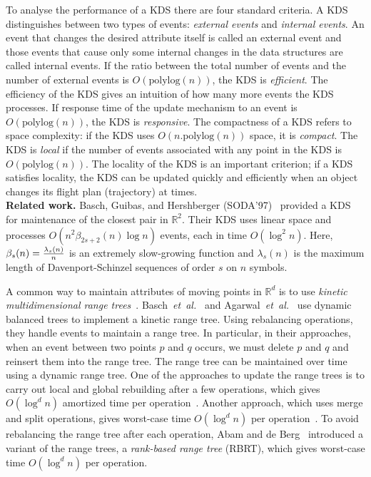 \documentclass[11pt]{llncs}
\newcommand{\etal}{\emph{et~al.}}
\begin{document}
To analyse the performance of a KDS there are four standard criteria. A KDS distinguishes between two types of events: \textit{external events} and \textit{internal events}. An event that changes the desired attribute itself is called an external event and those events that cause only some internal changes in the data structures are called internal events. If the ratio between the total number of events and the number of external events is $O(\text{polylog}(n))$, the KDS is \textit{efficient}. The efficiency of the KDS gives an intuition of how many more events the KDS processes. If response time of the update mechanism to an event is $O(\text{polylog}(n))$, the KDS is \textit{responsive}. The compactness of a KDS refers to space complexity: if the KDS uses $O(n.\text{polylog}(n))$ space, it is \textit{compact}. The KDS is \textit{local} if the number of events associated with any point in the KDS is $O(\text{polylog}(n))$. The locality of the KDS is an important criterion; if a KDS satisfies locality, the KDS can be updated quickly and efficiently when an object changes its flight plan (trajectory) at times. 
\vspace{+5pt}
\\
\textbf{Related work.}
Basch, Guibas, and Hershberger (SODA'97)~\cite{Basch:1997:DSM:314161.314435} provided a KDS for maintenance of the closest pair in $\mathbb{R}^2$. Their KDS uses linear space and processes $O(n^2\beta_{2s+2}(n)\log n)$ events, each in time $O(\log^2 n)$. Here, $\beta_s(n)={\lambda_s(n)\over n}$ is an extremely slow-growing function and $\lambda_s(n)$ is the maximum length of Davenport-Schinzel sequences of order $s$ on $n$ symbols.

A common way to maintain attributes of moving points in $\mathbb{R}^d$ is to use \textit{kinetic multidimensional range trees}~\cite{Basch:1997:PPM:262839.262998,Agarwal:2008:KDD:1435375.1435379,Abam:2007:KKL:1247069.1247133}.  Basch~\etal~\cite{Basch:1997:PPM:262839.262998} and Agarwal~\etal~\cite{Agarwal:2008:KDD:1435375.1435379} use dynamic balanced trees to implement a kinetic range tree. Using rebalancing operations, they handle events to maintain a range tree. In particular, in their approaches, when an event between two points $p$ and $q$ occurs, we must delete $p$ and $q$ and reinsert them into the range tree. The range tree can be maintained over time using a dynamic range tree. One of the approaches to update the range trees is to carry out local and global rebuilding after a few operations, which gives $O(\log^d n)$ amortized time per operation~\cite{Mehlhorn:1984:DSA:1923}. Another approach, which uses merge and split operations, gives worst-case time $O(\log^d n)$ per operation~\cite{Willard:1985:ARR:3828.3839}. To avoid rebalancing the range tree after each operation, Abam and de Berg~\cite{Abam:2011:KSX:1971362.1971367} introduced a variant of the range trees, a \textit{rank-based range tree} (RBRT), which gives worst-case time $O(\log^d n)$ per operation.
\end{document}
